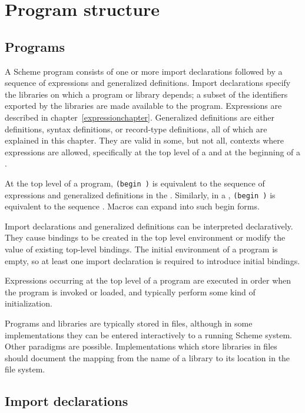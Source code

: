 \chapter{Program structure}
\label{programchapter}

\section{Programs}

A Scheme program consists of  
one or more import declarations followed by a sequence of
expressions and generalized definitions.
Import declarations specify the libraries on which a program or library depends;
a subset of the identifiers exported by the libraries are made available to
the program.
Expressions are described in chapter~\ref{expressionchapter}.
Generalized definitions are either definitions, syntax definitions, or
record-type definitions, all of which are explained in this chapter.
They are valid in some, but not all, contexts where expressions
are allowed, specifically at the top level of a 
and at the beginning of a .

At the top level of a program, {\tt(begin  \dotsfoo)} is
equivalent to the sequence of expressions and generalized definitions
in the .   
Similarly, in a , {\tt(begin  \dotsfoo)} is equivalent
to the sequence  \dotsfoo.
Macros can expand into such {\cf begin} forms.

Import declarations and generalized definitions can be interpreted declaratively.
They cause bindings to be created in the top level
environment or modify the value of existing top-level bindings.
The initial environment of a program is empty,
so at least one import declaration is required to introduce initial bindings.

Expressions occurring at the top level of a program are
executed in order when the program is
invoked or loaded, and typically perform some kind of initialization.


Programs and libraries are typically stored in files, although
in some implementations they can be entered interactively to a running
Scheme system.  Other paradigms are possible.
Implementations which store libraries in files should document the
mapping from the name of a library to its location in the file system.

\section{Import declarations}


